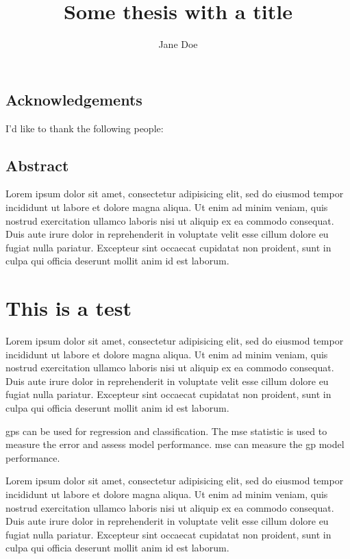 \documentclass[a4paper,palatino,11pt,twoside]{thesis}
\title{Some thesis with a title}
\author{Jane Doe}
\begin{document}
	\startpreamble
	
	
	\section*{Acknowledgements}
	I'd like to thank the following people:
	
	\newpage
	\section*{Abstract}
	Lorem ipsum dolor sit amet, consectetur adipisicing elit, sed do eiusmod tempor incididunt ut labore et dolore magna aliqua. Ut enim ad minim veniam, quis nostrud exercitation ullamco laboris nisi ut aliquip ex ea commodo consequat. Duis aute irure dolor in reprehenderit in voluptate velit esse cillum dolore eu fugiat nulla pariatur. Excepteur sint occaecat cupidatat non proident, sunt in culpa qui officia deserunt mollit anim id est laborum.
	
	\tableofcontents
	\listoffigures
	\listoftables
	
	\printnomenclature[2cm]
	
	\stoppreamble
	
	\chapter{This is a test}
	Lorem ipsum dolor sit amet, consectetur adipisicing elit, sed do eiusmod tempor incididunt ut labore et dolore magna aliqua. Ut enim ad minim veniam, quis nostrud exercitation ullamco laboris nisi ut aliquip ex ea commodo consequat. Duis aute irure dolor in reprehenderit in voluptate velit esse cillum dolore eu fugiat nulla pariatur. Excepteur sint occaecat cupidatat non proident, sunt in culpa qui officia deserunt mollit anim id est laborum.
	
	\Glspl{gp} can be used for regression and classification. The \gls{mse} statistic is used to measure the error and assess model performance. \Gls{mse} can measure the \gls{gp} model performance.

	
	Lorem ipsum dolor sit amet, consectetur adipisicing elit, sed do eiusmod tempor incididunt ut labore et dolore magna aliqua. Ut enim ad minim veniam, quis nostrud exercitation ullamco laboris nisi ut aliquip ex ea commodo consequat. Duis aute irure dolor in reprehenderit in voluptate velit esse cillum dolore eu fugiat nulla pariatur. Excepteur sint occaecat cupidatat non proident, sunt in culpa qui officia deserunt mollit anim id est laborum.
	
\end{document}
